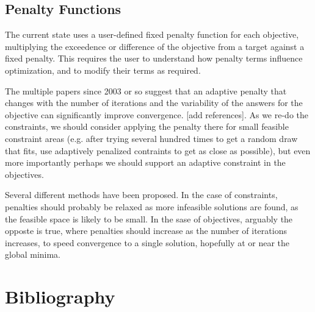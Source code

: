 \documentclass[12pt,letterpaper,english]{article}
\begin{document}
\subsection{Penalty Functions \label{sec:penalty}}
The current state uses a user-defined fixed penalty function for each objective, multiplying the exceedence or difference of the objective from a target against a fixed penalty.  This requires the user to understand how penalty terms influence optimization, and to modify their terms as required.

The multiple papers since 2003 or so suggest that an adaptive penalty that changes with the number of iterations and the variability of the answers for the objective can significantly improve convergence. [add references].  As we re-do the constraints, we should consider applying the penalty there for small feasible constraint areas (e.g. after trying several hundred times to get a random draw that fits, use adaptively penalized contraints to get as close as possible), but even more importantly perhaps we should support an adaptive constraint in the objectives.

Several different methods have been proposed.  In the case of constraints,
penalties should probably be relaxed as more infeasible solutions are found, as the feasible space is likely to be small.  In the sase of objectives, arguably the opposte is true, where penalties should increase as the number of iterations increases, to speed convergence to a single solution, hopefully at or near the global minima.


\section{Bibliography}
%

\end{document}
